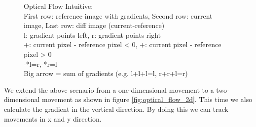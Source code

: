 \documentclass[11pt,a4paper,titlepage,oneside]{report}
\begin{document}
\begin{figure}[H]
	\caption{Optical Flow Intuitive:\\
		First row: reference image with gradients, Second row: current image, Last row:  diff image (current-reference)\\
		l: gradient points left, r: gradient points right\\
		+: current pixel - reference pixel < 0, +: current pixel - reference pixel > 0\\
		-*l=r,-*r=l\\
		Big arrow = sum of gradients (e.g. l+l+l=l, r+r+l=r)
	}\label{fig:optical_flow_intuitive}
\end{figure}

We extend the above scenario from a one-dimensional movement to a two-dimensional movement as shown in figure \ref{fig:optical_flow_2d}. This time we also calculate the gradient in the vertical direction. By doing this we can track movements in x and y direction.
\end{document}
